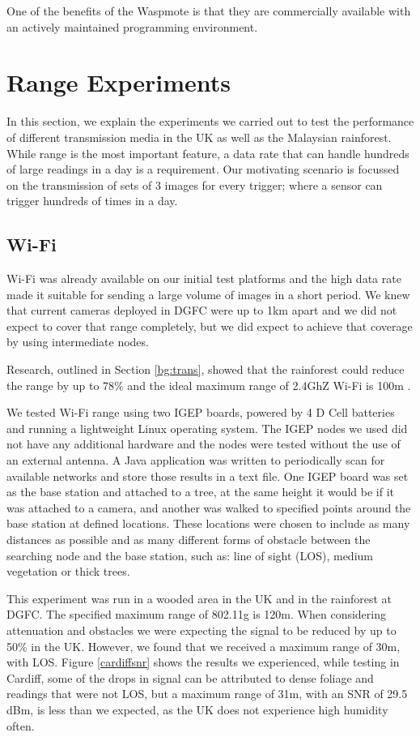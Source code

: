 One of the benefits of the Waspmote is that they are commercially available with an actively maintained programming environment.

\section{Range Experiments}\label{tech:wireless}
	In this section, we explain the experiments we carried out to test the performance of different transmission media in the UK as well as the Malaysian rainforest. While range is the most important feature, a data rate that can handle hundreds of large readings in a day is a requirement. Our motivating scenario is focussed on the transmission of sets of 3 images for every trigger; where a sensor can trigger hundreds of times in a day.

\subsection{Wi-Fi}\label{tech:wifirange}
Wi-Fi was already available on our initial test platforms and the high data rate made it suitable for sending a large volume of images in a short period. We knew that current cameras deployed in DGFC were up to 1km apart and we did not expect to cover that range completely, but we did expect to achieve that coverage by using intermediate nodes.

Research, outlined in Section \ref{bg:trans}, showed that the rainforest could reduce the range by up to 78\% and the ideal maximum range of 2.4GhZ Wi-Fi is 100m \cite{Dhawan2007}. 

We tested Wi-Fi range using two IGEP boards, powered by 4 D Cell batteries and running a lightweight Linux operating system.	The IGEP nodes we used did not have any additional hardware and the nodes were tested without the use of an external antenna. A Java application was written to periodically scan for available networks and store those results in a text file. One IGEP board was set as the base station and attached to a tree, at the same height it would be if it was attached to a camera, and another was walked to specified points around the base station at defined locations. These locations were chosen to include as many distances as possible and as many different forms of obstacle between the searching node and the base station, such as: line of sight (LOS), medium vegetation or thick trees.
			
This experiment was run in a wooded area in the UK and in the rainforest at DGFC. The specified maximum range of 802.11g is 120m. When considering attenuation and obstacles we were expecting the signal to be reduced by up to 50\% in the UK. However, we found that we received a maximum range of 30m, with LOS. Figure \ref{cardiffsnr} shows the results we experienced, while testing in Cardiff, some of the drops in signal can be attributed to dense foliage and readings that were not LOS, but a maximum range of 31m, with an SNR of 29.5 dBm, is less than we expected, as the UK does not experience high humidity often.
			
